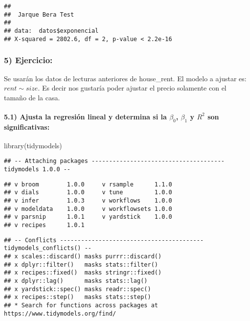 \documentclass[
]{article}
\newenvironment{Shaded}{\begin{snugshade}}{\end{snugshade}}
\newcommand{\FunctionTok}[1]{\textcolor[rgb]{0.00,0.00,0.00}{#1}}
\newcommand{\NormalTok}[1]{#1}
\begin{document}
\begin{verbatim}
## 
##  Jarque Bera Test
## 
## data:  datos$exponencial
## X-squared = 2802.6, df = 2, p-value < 2.2e-16
\end{verbatim}

\hypertarget{ejercicio}{%
\subsubsection{5) Ejercicio:}\label{ejercicio}}

Se usarán los datos de lecturas anteriores de house\_rent. El modelo a
ajustar es: \(rent \sim size\). Es decir nos gustaría poder ajustar el
precio solamente con el tamaño de la casa.

\hypertarget{ajusta-la-regresiuxf3n-lineal-y-determina-si-la-beta_0-beta_1-y-r2-son-significativas}{%
\paragraph{\texorpdfstring{5.1) Ajusta la regresión lineal y determina
si la \(\beta_0\), \(\beta_1\) y \(R^2\) son
significativas:}{5.1) Ajusta la regresión lineal y determina si la \textbackslash beta\_0, \textbackslash beta\_1 y R\^{}2 son significativas:}}\label{ajusta-la-regresiuxf3n-lineal-y-determina-si-la-beta_0-beta_1-y-r2-son-significativas}}

\begin{Shaded}
\begin{Highlighting}[]
\FunctionTok{library}\NormalTok{(tidymodels)}
\end{Highlighting}
\end{Shaded}

\begin{verbatim}
## -- Attaching packages -------------------------------------- tidymodels 1.0.0 --
\end{verbatim}

\begin{verbatim}
## v broom        1.0.0     v rsample      1.1.0
## v dials        1.0.0     v tune         1.0.0
## v infer        1.0.3     v workflows    1.0.0
## v modeldata    1.0.0     v workflowsets 1.0.0
## v parsnip      1.0.1     v yardstick    1.0.0
## v recipes      1.0.1
\end{verbatim}

\begin{verbatim}
## -- Conflicts ----------------------------------------- tidymodels_conflicts() --
## x scales::discard() masks purrr::discard()
## x dplyr::filter()   masks stats::filter()
## x recipes::fixed()  masks stringr::fixed()
## x dplyr::lag()      masks stats::lag()
## x yardstick::spec() masks readr::spec()
## x recipes::step()   masks stats::step()
## * Search for functions across packages at https://www.tidymodels.org/find/
\end{verbatim}
\end{document}
